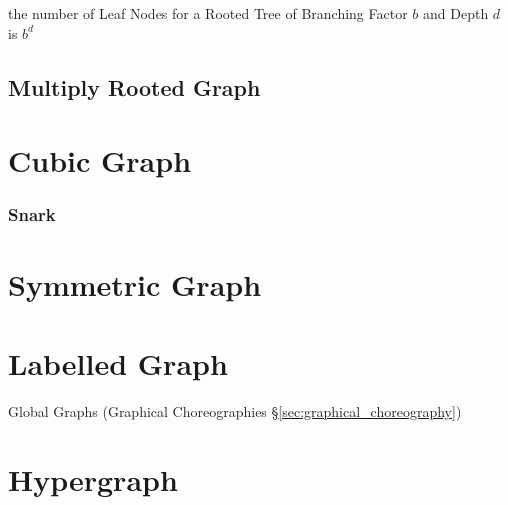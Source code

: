 the number of Leaf Nodes for a Rooted Tree of Branching Factor $b$ and
Depth $d$ is $b^d$ %



\subsection{Multiply Rooted Graph}\label{sec:multiply_rooted}



\section{Cubic Graph}\label{sec:cubic_graph}

\subsubsection{Snark}\label{sec:snark}



\section{Symmetric Graph}\label{sec:symmetric_graph}

\section{Labelled Graph}\label{sec:labelled_graph}

\fist Global Graphs (Graphical Choreographies
\S\ref{sec:graphical_choreography})



\section{Hypergraph}\label{sec:hypergraph}

